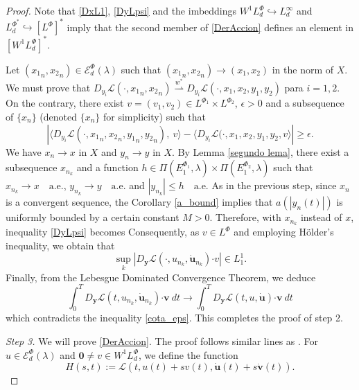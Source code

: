 \documentclass[twoside]{article}
\theoremstyle{remark}
\newcommand{\lphi}{L^{\Phi}}
\newcommand{\lphiuno}{L^{\Phi_1}}
\newcommand{\lphidos}{L^{\Phi_2}}
\newcommand{\lpsi}{L^{\Phi^*}}
\newcommand{\lpsii}{L^{\Phie_i}}
\newcommand{\ephiuno}{E^{\Phi_1}}
\newcommand{\ephidos}{E^{\Phi_2}}
\newcommand{\wphi}{W^{1}\lphi}
\newcommand{\domi}{\mathcal{E}^{\Phi}_d(\lambda)}
\renewcommand{\b}[1]{\boldsymbol{#1}}
\newcommand{\ccdot}{\b{\cdot}}
\renewcommand{\leq}{\leqslant}
\renewcommand{\geq}{\geqslant}
\newcommand{\Phie}{\Phi^{*}}
\begin{document}
\begin{proof}
 Note that \eqref{DxL1},  \eqref{DyLpsi} and the imbeddings $\wphi_d \hookrightarrow L_d^{\infty}$ and  $\lpsi_d\hookrightarrow  \left[\lphi\right]^*$ imply that the second member of
\eqref{DerAccion} defines an element in $\left[\wphi_d\right]^*$.

Let $({x_1}_n,{x_2}_n)\in \domi$ such that $({x_1}_n,{x_2}_n)\to (x_1,x_2)$ in the norm of $X$. 
We must prove that  $D_{y_i}\mathcal{L}(\cdot,{x_1}_n,{x_2}_n)\overset{w^*}{\rightharpoonup} 
D_{y_i}\mathcal{L}(\cdot,x_1,x_2,y_1,y_2)$ para $i=1,2$.
On the contrary, there exist $v=(v_1,v_2)\in\lphiuno\times\lphidos$, $\epsilon>0$ and a subsequence of $\{x_n\}$ (denoted  $\{x_n\}$ for simplicity)  such that
\begin{equation}\label{cota_eps}
 \left| \langle D_{y_i}\mathcal{L}(\cdot, {x_1}_n,{x_2}_n,{y_1}_n,{y_2}_n),\
v \rangle - \langle  D_{y_i}\mathcal{L}(\cdot,x_1,x_2, y_1,y_2,v \rangle\right|\geq \epsilon.
\end{equation}
We have $x_n \rightarrow x$ in $X$ and
$y_n\rightarrow y$ in $X$. By Lemma \ref{segundo lema}, 
there exist a subsequence $x_{n_k}$ and a function $h\in \Pi(\ephiuno_1,\lambda)\times\Pi(\ephidos_1,\lambda) $ such that $x_{n_k}\rightarrow x \quad\text{a.e.}$, $y_{n_k}\rightarrow y \quad\text{a.e.}$ and $|y_{n_k}|\leq h\quad\text{a.e.}$ 
As in the previous step, since $x_n$ is a convergent sequence, the Corollary \ref{a_bound} implies that $a(|y_n(t)|)$ is uniformly bounded by a certain constant $M>0$. 
Therefore,  with $x_{n_k}$ instead of $x$, inequality  \eqref{DyLpsi} becomes 
Consequently, as $v \in \lphi$ and employing H\"older's inequality, we obtain that
\[\sup_k|D_{\b{y}}\mathcal{L}(\cdot,u_{n_k},\b{\dot{u}}_{n_k})\ccdot v| \in L^1_1.\]
  Finally, from the Lebesgue Dominated Convergence Theorem, we deduce
\begin{equation}\label{conv_debil}\int_0^T  D_{\b{y}}\mathcal{L}(t,u_{n_k},\b{\dot{u}}_{n_k})\ccdot\b{ v} \ dt \to \int_0^T D_{\b{y}}\mathcal{L}(t,u,\b{\dot{u}})\ccdot\b{ v}\ dt \end{equation}
which contradicts the inequality \eqref{cota_eps}. This completes the proof of step 2.

\emph{Step 3.} We will prove \eqref{DerAccion}. The proof follows similar lines as \cite[Thm. 1.4]{mawhin2010critical}. For $u\in \domi$ and $\b{0}\neq v\in\wphi_d$, we define the function
\[H(s,t):=\mathcal{L}(t,u(t)+sv(t),\b{\dot{u}}(t)+s\b{\dot{v}}(t)).\]


\end{proof}
\end{document}
